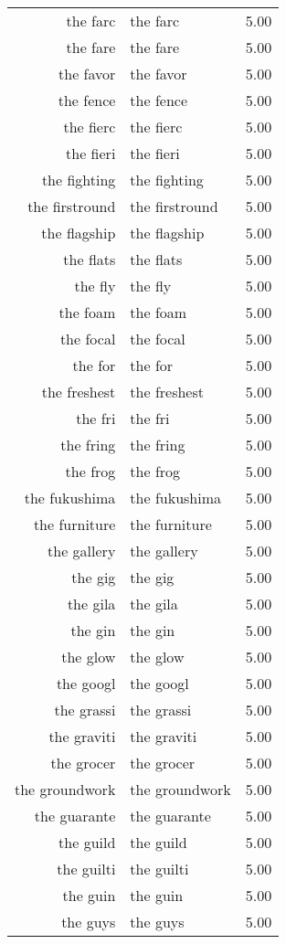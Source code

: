 \begin{table}[ht]
\begin{tabular}{rlr}
  the farc & the farc & 5.00 \\ 
  the fare & the fare & 5.00 \\ 
  the favor & the favor & 5.00 \\ 
  the fence & the fence & 5.00 \\ 
  the fierc & the fierc & 5.00 \\ 
  the fieri & the fieri & 5.00 \\ 
  the fighting & the fighting & 5.00 \\ 
  the firstround & the firstround & 5.00 \\ 
  the flagship & the flagship & 5.00 \\ 
  the flats & the flats & 5.00 \\ 
  the fly & the fly & 5.00 \\ 
  the foam & the foam & 5.00 \\ 
  the focal & the focal & 5.00 \\ 
  the for & the for & 5.00 \\ 
  the freshest & the freshest & 5.00 \\ 
  the fri & the fri & 5.00 \\ 
  the fring & the fring & 5.00 \\ 
  the frog & the frog & 5.00 \\ 
  the fukushima & the fukushima & 5.00 \\ 
  the furniture & the furniture & 5.00 \\ 
  the gallery & the gallery & 5.00 \\ 
  the gig & the gig & 5.00 \\ 
  the gila & the gila & 5.00 \\ 
  the gin & the gin & 5.00 \\ 
  the glow & the glow & 5.00 \\ 
  the googl & the googl & 5.00 \\ 
  the grassi & the grassi & 5.00 \\ 
  the graviti & the graviti & 5.00 \\ 
  the grocer & the grocer & 5.00 \\ 
  the groundwork & the groundwork & 5.00 \\ 
  the guarante & the guarante & 5.00 \\ 
  the guild & the guild & 5.00 \\ 
  the guilti & the guilti & 5.00 \\ 
  the guin & the guin & 5.00 \\ 
  the guys & the guys & 5.00 \\ 

\end{tabular}
\end{table}
